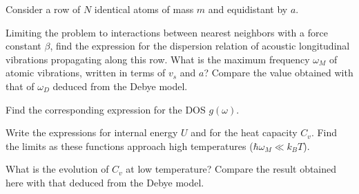 \begin{problem}
  Consider a row of $N$ identical atoms of mass $m$ and equidistant by $a$.
  \begin{enumext}[label = (\alph*)]
    \item Limiting the problem to interactions between nearest neighbors with a
    force constant $\beta$, find the expression for the dispersion relation of
    acoustic longitudinal vibrations propagating along this row. What is the
    maximum frequency $\omega_M$ of atomic vibrations, written in terms of
    $v_s$ and $a$? Compare the value obtained with that of $\omega_D$ deduced
    from the Debye model.
    \item Find the corresponding expression for the DOS $g(\omega)$.
    \item Write the expressions for internal energy $U$ and for the heat
    capacity $C_v$. Find the limits as these functions approach high
    temperatures ($\hbar\omega_M \ll k_BT$).
    \item What is the evolution of $C_v$ at low temperature? Compare the result
    obtained here with that deduced from the Debye model.
  \end{enumext}
\end{problem}
